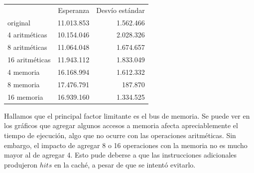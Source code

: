 \documentclass[a4paper]{article}
\begin{document}
\begin{tabular}{l|r|r} %
 & Esperanza & Desvío estándar \\
 original & 11.013.853 & 1.562.466 \\
 4 aritméticas & 10.154.046 & 2.028.326 \\
 8 aritméticas & 11.064.048 & 1.674.657 \\
 16 aritméticas & 11.943.112 & 1.833.049 \\
 4 memoria & 16.168.994 & 1.612.332 \\
 8 memoria & 17.476.791 & 187.870 \\
 16 memoria & 16.939.160 & 1.334.525
\end{tabular}

Hallamos que el principal factor limitante es el bus de memoria. Se puede ver en los gráficos que agregar algunos accesos a memoria afecta apreciablemente el tiempo de ejecución, algo que no ocurre con las operaciones aritméticas. Sin embargo, el impacto de agregar 8 o 16 operaciones con la memoria no es mucho mayor al de agregar 4. Esto pude deberse a que las instrucciones adicionales produjeron $hits$ en la caché, a pesar de que se intentó evitarlo.
\end{document}
